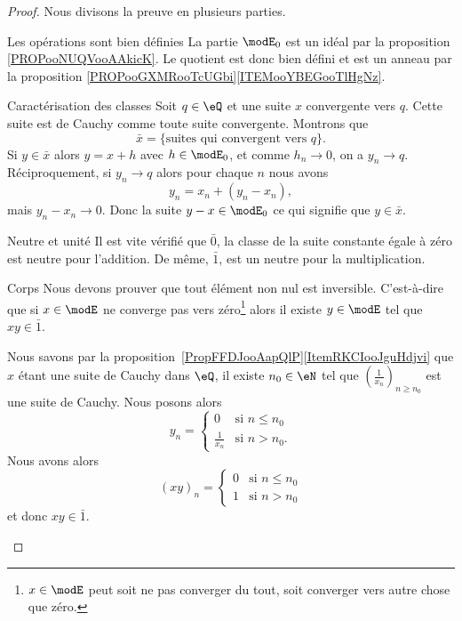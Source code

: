 \begin{proof}
    Nous divisons la preuve en plusieurs parties.
    \begin{subproof}
    \item[Les opérations sont bien définies]
        La partie \( \modE_0\) est un idéal par la proposition \ref{PROPooNUQVooAAkicK}. Le quotient est donc bien défini et est un anneau par la proposition \ref{PROPooGXMRooTcUGbi}\ref{ITEMooYBEGooTlHgNz}.
    \item[Caractérisation des classes]
        Soit \( q\in \eQ\) et une suite \( x\) convergente vers \( q\). Cette suite est de Cauchy comme toute suite convergente. Montrons que
        \begin{equation}
            \bar x=\{ \text{suites qui convergent vers } q \}.
        \end{equation}
        Si \( y\in\bar x\) alors \( y=x+h\) avec \( h\in \modE_0\), et comme \( h_n\to 0\), on a \( y_n\to q\). Réciproquement, si \( y_n\to q\) alors pour chaque \( n\) nous avons
        \begin{equation}
            y_n=x_n+(y_n-x_n),
        \end{equation}
        mais \( y_n-x_n\to 0\). Donc la suite \( y-x\in\modE_0\) ce qui signifie que \( y\in\bar x\).
    \item[Neutre et unité]
        Il est vite vérifié que \( \bar 0\), la classe de la suite constante égale à zéro est neutre pour l'addition. De même, \( \bar 1\), est un neutre pour la multiplication.
    \item[Corps]
        Nous devons prouver que tout élément non nul est inversible. C'est-à-dire que si \( x\in\modE\) ne converge pas vers zéro\footnote{\( x\in\modE\) peut soit ne pas converger du tout, soit converger vers autre chose que zéro.} alors il existe \( y\in \modE\) tel que \( xy\in\bar 1\).

        Nous savons par la proposition~\ref{PropFFDJooAapQlP}\ref{ItemRKCIooJguHdjvi} que \( x\) étant une suite de Cauchy dans \( \eQ\), il existe \( n_0\in \eN\) tel que \( \left( \frac{1}{ x_n } \right)_{n\geq n_0}\) est une suite de Cauchy. Nous posons alors
        \begin{equation}
            y_n=\begin{cases}
                0    &   \text{si } n\leq n_0\\
                \frac{1}{ x_n }    &    \text{si } n>n_0.
            \end{cases}
        \end{equation}
        Nous avons alors
        \begin{equation}
            (xy)_n=\begin{cases}
                0    &   \text{si } n\leq n_0\\
                1    &    \text{si } n>n_0
            \end{cases}
        \end{equation}
        et donc \( xy\in\bar 1\).
    \end{subproof}
\end{proof}

